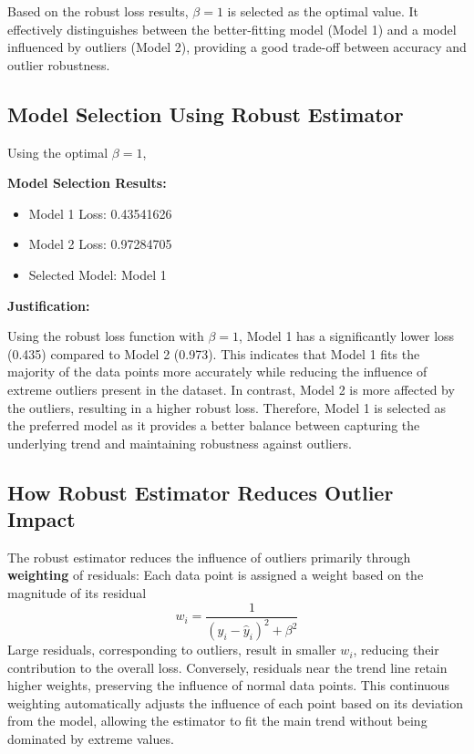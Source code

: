 \documentclass[12pt]{article}
\begin{document}
Based on the robust loss results, $\beta = 1$ is selected as the optimal value. It effectively distinguishes between the better-fitting model (Model 1) and a model influenced by outliers (Model 2), providing a good trade-off between accuracy and outlier robustness.


\subsection{Model Selection Using Robust Estimator}

Using the optimal $\beta = 1$, 

\textbf{Model Selection Results:}
\begin{itemize}
    \item Model 1 Loss: 0.43541626
    \item Model 2 Loss: 0.97284705
    \item Selected Model: Model 1
\end{itemize}

\textbf{Justification:} 

Using the robust loss function with $\beta = 1$, Model 1 has a significantly lower loss (0.435) compared to Model 2 (0.973). This indicates that Model 1 fits the majority of the data points more accurately while reducing the influence of extreme outliers present in the dataset. In contrast, Model 2 is more affected by the outliers, resulting in a higher robust loss. Therefore, Model 1 is selected as the preferred model as it provides a better balance between capturing the underlying trend and maintaining robustness against outliers.


\subsection{How Robust Estimator Reduces Outlier Impact}

The robust estimator reduces the influence of outliers primarily through \textbf{weighting} of residuals:
Each data point is assigned a weight based on the magnitude of its residual
\begin{equation}
w_i = \frac{1}{(y_i - \hat{y}_i)^2 + \beta^2}
\end{equation}
Large residuals, corresponding to outliers, result in smaller $w_i$, reducing their contribution to the overall loss. Conversely, residuals near the trend line retain higher weights, preserving the influence of normal data points.
This continuous weighting automatically adjusts the influence of each point based on its deviation from the model, allowing the estimator to fit the main trend without being dominated by extreme values.
\end{document}
